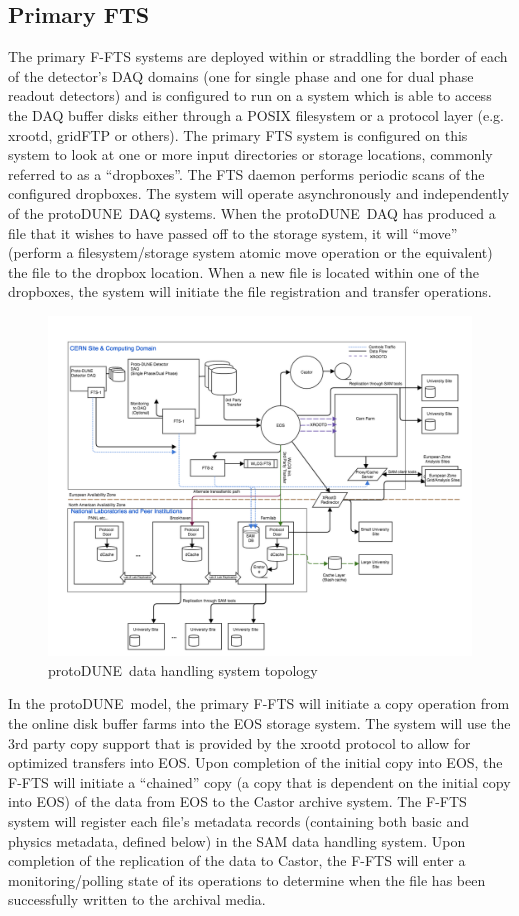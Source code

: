 \documentclass[pdftex,12pt,letter]{article}
\newcommand{\pd}{protoDUNE\ }
\begin{document}
\subsection{Primary FTS}
The  primary F-FTS systems are deployed within or straddling the border
of each of the detector’s DAQ domains (one for single phase and one for dual phase readout detectors) and is
configured to run on a system which is able to access the DAQ buffer disks either through a POSIX filesystem or
a protocol layer (e.g. xrootd, gridFTP or others).  The primary FTS system is configured on this system
to look at one or more input directories or storage locations, commonly referred to as a ``dropboxes''.
The FTS daemon performs periodic scans of the configured dropboxes. The system will operate asynchronously
and independently of the \pd DAQ systems.  When the \pd DAQ has produced a file that it wishes to have passed
off to the storage system, it will ``move'' (perform a filesystem/storage system atomic move operation or the equivalent)
the file to the dropbox location. When a new file is located within one of the dropboxes,
the system will initiate the file registration and transfer operations.
\begin{figure}[tbh]
\centering\includegraphics[width=0.99\linewidth]{protDune-datahandling-topology.png}
\caption{\label{fig:sys_topology}\pd data handling system topology}
\end{figure}
In the \pd model, the primary F-FTS will initiate a copy operation from the online disk buffer farms into the EOS storage system. 
The system will use the 3rd party copy support that is provided by the xrootd protocol to allow for optimized transfers into EOS. 
Upon completion of the initial copy into EOS, the F-FTS will initiate a ``chained'' copy (a copy that is dependent on the initial copy into EOS)
of the data from EOS to the Castor archive system.  The F-FTS system will register each file’s metadata records (containing both basic and
physics metadata, defined below)  in the SAM data handling system.  Upon completion of the replication of the data to Castor,
the F-FTS will enter a monitoring/polling state of its operations to determine when the file has been successfully written to the archival media.
\end{document}

